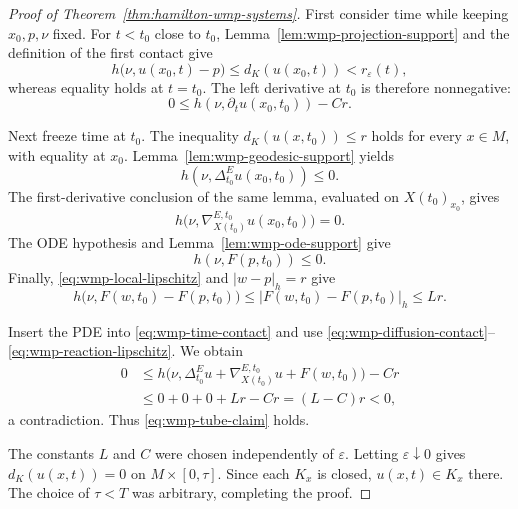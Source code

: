 \documentclass[10pt]{coll-l}
\theoremstyle{definition}
\theoremstyle{remark}
\numberwithin{section}{chapter}
\numberwithin{equation}{chapter}
\begin{document}
\begin{proof}[Proof of Theorem~\ref{thm:hamilton-wmp-systems}]
First consider time while keeping $x_0,p,\nu$ fixed.  For $t<t_0$ close to
$t_0$, Lemma~\ref{lem:wmp-projection-support} and the definition of the
first contact give
\[
 h\bigl(\nu,u(x_0,t)-p\bigr)
     \leq d_K(u(x_0,t))
     <r_\varepsilon(t),
\]
whereas equality holds at $t=t_0$.  The left derivative at $t_0$ is
therefore nonnegative:
\begin{equation}
       0\leq h(\nu,\partial_tu(x_0,t_0))-Cr.               \label{eq:wmp-time-contact}
\end{equation}

Next freeze time at $t_0$.  The inequality
$d_K(u(x,t_0))\leq r$ holds for every $x\in M$, with equality at $x_0$.
Lemma~\ref{lem:wmp-geodesic-support} yields
\begin{equation}
       h(\nu,\Delta_{t_0}^E u(x_0,t_0))\leq0.              \label{eq:wmp-diffusion-contact}
\end{equation}
The first-derivative conclusion of the same lemma, evaluated on
$X(t_0)_{x_0}$, gives
\begin{equation}
 h\bigl(\nu,\nabla^{E,t_0}_{X(t_0)}u(x_0,t_0)\bigr)=0.      \label{eq:wmp-drift-contact}
\end{equation}
The ODE hypothesis and Lemma~\ref{lem:wmp-ode-support} give
\begin{equation}
       h(\nu,F(p,t_0))\leq0.                               \label{eq:wmp-reaction-at-p}
\end{equation}
Finally, \eqref{eq:wmp-local-lipschitz} and $|w-p|_h=r$ give
\begin{equation}
 h\bigl(\nu,F(w,t_0)-F(p,t_0)\bigr)
     \leq |F(w,t_0)-F(p,t_0)|_h
     \leq Lr.                                             \label{eq:wmp-reaction-lipschitz}
\end{equation}

Insert the PDE into \eqref{eq:wmp-time-contact} and use
\eqref{eq:wmp-diffusion-contact}--\eqref{eq:wmp-reaction-lipschitz}.  We
obtain
\[
 \begin{split}
  0
  &\leq h\bigl(\nu,\Delta_{t_0}^E u
             +\nabla^{E,t_0}_{X(t_0)}u+F(w,t_0)\bigr)-Cr\\
  &\leq 0+0+0+Lr-Cr
   =(L-C)r<0,
 \end{split}
\]
a contradiction.  Thus \eqref{eq:wmp-tube-claim} holds.

The constants $L$ and $C$ were chosen independently of $\varepsilon$.
Letting $\varepsilon\downarrow0$ gives
$d_K(u(x,t))=0$ on $M\times[0,\tau]$.  Since each $K_x$ is closed,
$u(x,t)\in K_x$ there.  The choice of $\tau<T$ was arbitrary, completing
the proof.
\end{proof}
\end{document}
